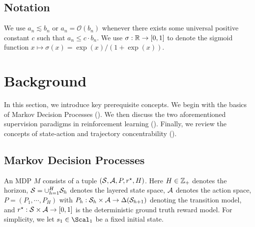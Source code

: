 \documentclass{article}
\begin{document}
\subsection{Notation}
We use $a_n\lesssim b_n$ or $a_n = \mathcal{O}(b_n)$ whenever there exists some universal positive constant $c$ such that $a_n\le c\cdot b_n$. We use $\sigma: \mathbb{R}\to [0, 1]$ to denote the sigmoid function $x\mapsto\sigma(x) = \exp(x)/(1 + \exp(x))$.







\section{Background}
In this section, we introduce key prerequisite concepts. We begin with the basics of Markov Decision Processes (). We then discuss the two aforementioned supervision paradigms in reinforcement learning (). Finally, we review the concepts of state-action and trajectory concentrability ().

\subsection{Markov Decision Processes}\label{sec: prem-mdp}
An MDP $M$ consists of a tuple $(\mathcal{S}, \mathcal{A}, P, r^\star, H)$. Here $H\in \mathbb{Z}_+$ denotes the horizon, $\mathcal{S} = \cup_{h=1}^H \mathcal{S}_h$ denotes the layered state space, $\mathcal{A}$ denotes the action space, $P = (P_1, \cdots, P_H)$ with $P_h: \mathcal{S}_h\times\mathcal{A}\to \Delta(\mathcal{S}_{h+1})$ denoting the transition model, and $r^\star: \mathcal{S}\times\mathcal{A}\to [0, 1]$ 
is the deterministic ground truth reward model.
For simplicity, we let $s_1\in\Scal_1$ be a fixed initial state.
\end{document}
